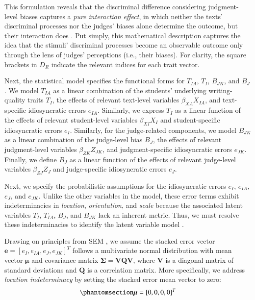 \documentclass[
  authoryear,
  review,
  1p]{elsarticle}
\begin{document}
This formulation reveals that the discriminal difference considering
judgment-level biases captures a \emph{pure interaction effect}, in
which neither the texts' discriminal processes nor the judges' biases
alone determine the outcome, but their interaction does
\citep{Attia_et_al_2022}. Put simply, this mathematical description
captures the idea that the stimuli' discriminal processes become an
observable outcome only through the lens of judges' perceptions (i.e.,
their biases). For clarity, the square brackets in \(D_{R}\) indicate
the relevant indices for each trait vector.

Next, the statistical model specifies the functional forms for
\(T_{IA}\), \(T_{I}\), \(B_{JK}\), and \(B_{J}\). We model \(T_{IA}\) as
a linear combination of the students' underlying writing-quality traits
\(T_{I}\), the effects of relevant text-level variables
\(\beta_{XA} X_{IA}\), and text-specific idiosyncratic errors
\(e_{IA}\). Similarly, we express \(T_{I}\) as a linear function of the
effects of relevant student-level variables \(\beta_{XI} X_{I}\) and
student-specific idiosyncratic errors \(e_{I}\). Similarly, for the
judge-related components, we model \(B_{JK}\) as a linear combination of
the judge-level bias \(B_{J}\), the effects of relevant judgment-level
variables \(\beta_{ZK} Z_{JK}\), and judgment-specific idiosyncratic
errors \(e_{JK}\). Finally, we define \(B_{J}\) as a linear function of
the effects of relevant judge-level variables \(\beta_{ZJ} Z_{J}\) and
judge-specific idiosyncratic errors \(e_{J}\).

Next, we specify the probabilistic assumptions for the idiosyncratic
errors \(e_{I}\), \(e_{IA}\), \(e_{J}\), and \(e_{JK}\). Unlike the
other variables in the model, these error terms exhibit indeterminacies
in \emph{location}, \emph{orientation}, and \emph{scale} because the
associated latent variables \(T_{I}\), \(T_{IA}\), \(B_{J}\), and
\(B_{JK}\) lack an inherent metric. Thus, we must resolve these
indeterminacies to identify the latent variable model
\citep{Depaoli_2021, deAyala_2009}.

Drawing on principles from SEM \citep{Hoyle_et_al_2023}, we assume the
stacked error vector
\(\boldsymbol{e} = [e_{I}, e_{IA}, e_{J}, e_{JK}]^{T}\) follows a
multivariate normal distribution with mean vector \(\boldsymbol{\mu}\)
and covariance matrix
\(\boldsymbol{\Sigma} = \boldsymbol{V}\boldsymbol{Q}\boldsymbol{V}\),
where \(\boldsymbol{V}\) is a diagonal matrix of standard deviations and
\(\boldsymbol{Q}\) is a correlation matrix. More specifically, we
address \emph{location indeterminacy} by setting the stacked error mean
vector to zero: \begin{equation}\protect\phantomsection\label{eq-mat53}{
\boldsymbol{\mu} = [0, 0, 0, 0]^{T}
}\end{equation}
\end{document}
